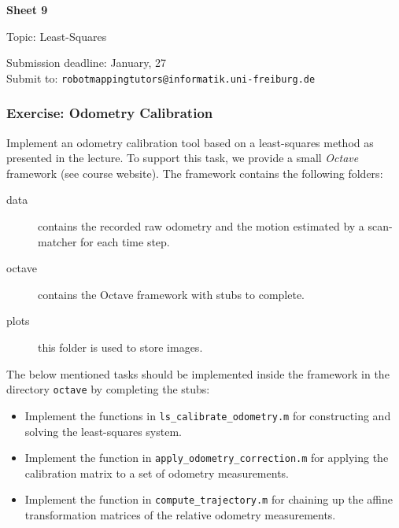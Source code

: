 \documentclass[12pt]{article}
\begin{document}


\begin{center}
{\bf \Large Sheet 9}

{\large Topic: Least-Squares}

Submission deadline: January, 27\\
Submit to: \texttt{robotmappingtutors@informatik.uni-freiburg.de}
\end{center}

\subsubsection*{Exercise: Odometry Calibration}

Implement an odometry calibration tool based on a least-squares method
as presented in the lecture. To support this task, we provide a small
\emph{Octave} framework (see course website).  The framework contains
the following folders:

\begin{description}
\item [data]
  contains the recorded raw odometry and the motion estimated by a
  scan-matcher for each time step.
\item [octave]
  contains the Octave framework with stubs to complete.
\item [plots]
  this folder is used to store images.
\end{description}

The below mentioned tasks should be implemented inside the framework in
the directory \texttt{octave} by completing the stubs:
\begin{itemize}
  \item
    Implement the functions in \texttt{ls\_calibrate\_odometry.m} for
    constructing and solving the least-squares system.
  \item
    Implement the function in \texttt{apply\_odometry\_correction.m} for
    applying the calibration matrix to a set of odometry measurements.
  \item
    Implement the function in \texttt{compute\_trajectory.m} for
    chaining up the affine transformation matrices of the relative
    odometry measurements.
\end{itemize}
\end{document}
